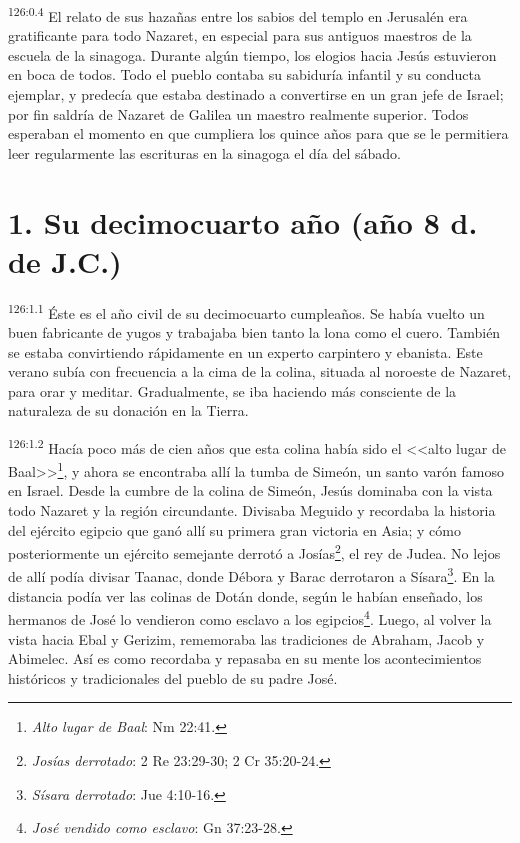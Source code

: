 \par 
\textsuperscript{126:0.4} El relato de sus hazañas entre los sabios del templo en Jerusalén era gratificante para todo Nazaret, en especial para sus antiguos maestros de la escuela de la sinagoga. Durante algún tiempo, los elogios hacia Jesús estuvieron en boca de todos. Todo el pueblo contaba su sabiduría infantil y su conducta ejemplar, y predecía que estaba destinado a convertirse en un gran jefe de Israel; por fin saldría de Nazaret de Galilea un maestro realmente superior. Todos esperaban el momento en que cumpliera los quince años para que se le permitiera leer regularmente las escrituras en la sinagoga el día del sábado.

\section*{1. Su decimocuarto año (año 8 d. de J.C.)}
\par 
\textsuperscript{126:1.1} Éste es el año civil de su decimocuarto cumpleaños. Se había vuelto un buen fabricante de yugos y trabajaba bien tanto la lona como el cuero. También se estaba convirtiendo rápidamente en un experto carpintero y ebanista. Este verano subía con frecuencia a la cima de la colina, situada al noroeste de Nazaret, para orar y meditar. Gradualmente, se iba haciendo más consciente de la naturaleza de su donación en la Tierra.

\par 
\textsuperscript{126:1.2} Hacía poco más de cien años que esta colina había sido el <<alto lugar de Baal>>\footnote{\textit{Alto lugar de Baal}: Nm 22:41.}, y ahora se encontraba allí la tumba de Simeón, un santo varón famoso en Israel. Desde la cumbre de la colina de Simeón, Jesús dominaba con la vista todo Nazaret y la región circundante. Divisaba Meguido y recordaba la historia del ejército egipcio que ganó allí su primera gran victoria en Asia; y cómo posteriormente un ejército semejante derrotó a Josías\footnote{\textit{Josías derrotado}: 2 Re 23:29-30; 2 Cr 35:20-24.}, el rey de Judea. No lejos de allí podía divisar Taanac, donde Débora y Barac derrotaron a Sísara\footnote{\textit{Sísara derrotado}: Jue 4:10-16.}. En la distancia podía ver las colinas de Dotán donde, según le habían enseñado, los hermanos de José lo vendieron como esclavo a los egipcios\footnote{\textit{José vendido como esclavo}: Gn 37:23-28.}. Luego, al volver la vista hacia Ebal y Gerizim, rememoraba las tradiciones de Abraham, Jacob y Abimelec. Así es como recordaba y repasaba en su mente los acontecimientos históricos y tradicionales del pueblo de su padre José.

